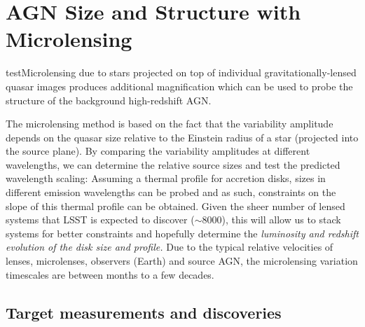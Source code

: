 %
%
%

\section{AGN Size and Structure with Microlensing}\label{sec:AGNMicrolensing}
\def\secname{\chpname:microlensing}\label{sec:\secname}


testMicrolensing due to stars projected on top of individual
gravitationally-lensed quasar images produces additional magnification which can be used to probe the structure of the background high-redshift AGN.


The microlensing method is based on the fact that the variability amplitude depends on the quasar size relative to the Einstein radius of a star (projected into the source plane). By comparing the variability amplitudes at different wavelengths, we can determine the relative source sizes and test the predicted wavelength scaling: Assuming a thermal profile for accretion disks, sizes in different emission
wavelengths can be probed and as such, constraints on the slope of this
thermal profile can be obtained. Given the sheer number of lensed systems that LSST is expected to discover ($\sim8000$), this will allow us to stack systems for better
constraints and hopefully determine the {\it luminosity and redshift evolution
of the disk size and profile.} Due to the typical relative velocities of lenses,
microlenses, observers (Earth) and source AGN, the microlensing variation
timescales are between months to a few decades.





\subsection{Target measurements and discoveries}
\label{sec:\secname:targets}

